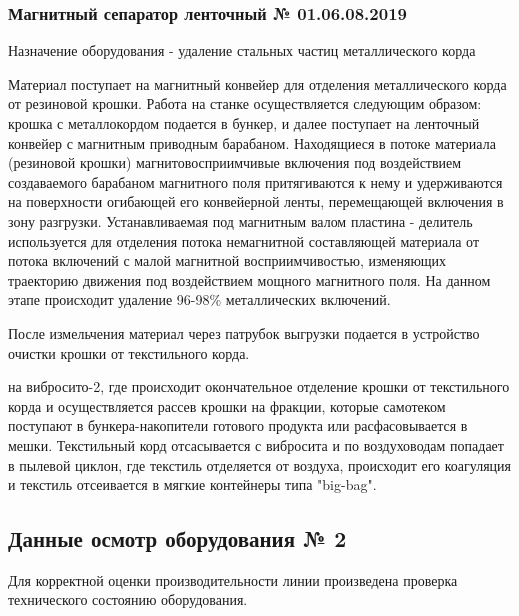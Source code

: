 \subsubsection{Магнитный сепаратор ленточный № 01.06.08.2019}

Назначение оборудования -  удаление стальных частиц металлического корда

\vspace{10mm}




Материал поступает на магнитный конвейер для отделения металлического корда от резиновой крошки. Работа на станке осуществляется следующим образом: крошка с металлокордом подается в бункер, и далее поступает на ленточный конвейер с магнитным приводным барабаном. Находящиеся в потоке материала (резиновой крошки) магнитовосприимчивые включения под воздействием создаваемого барабаном магнитного поля притягиваются к нему и удерживаются на поверхности огибающей его конвейерной ленты, перемещающей включения в зону разгрузки. Устанавливаемая под магнитным валом пластина - делитель используется для отделения потока немагнитной составляющей материала от потока включений с малой магнитной восприимчивостью, изменяющих траекторию движения под воздействием мощного магнитного поля. На данном этапе происходит удаление 96-98\% металлических включений.



	
	
После измельчения материал через патрубок выгрузки подается в устройство очистки крошки от текстильного корда.



на вибросито-2, где происходит окончательное отделение крошки от текстильного корда и осуществляется рассев крошки на фракции, которые самотеком поступают в бункера-накопители готового продукта или расфасовывается в мешки.
Текстильный корд отсасывается с вибросита и по воздуховодам попадает в пылевой циклон, где текстиль отделяется от воздуха, происходит его коагуляция и текстиль отсеивается в мягкие контейнеры типа "big-bag".


\subsection{Данные осмотр оборудования № 2}
Для корректной оценки производительности линии 
 произведена проверка технического состоянию оборудования.
